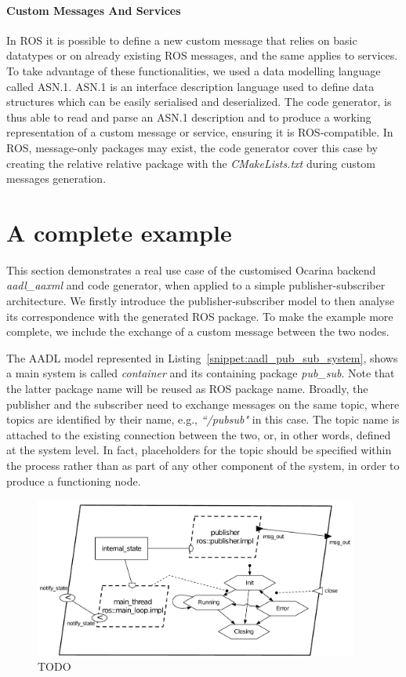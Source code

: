 \paragraph{Custom Messages And Services} In ROS it is possible to define a new custom message that relies on basic datatypes or on already existing ROS messages, and the same applies to services. To take advantage of these functionalities, we used a data modelling language called ASN.1. ASN.1 is an interface description language used to define data structures which can be easily serialised and deserialized. The code generator, is thus able to read and parse an ASN.1 description and to produce a working representation of a custom message or service, ensuring it is ROS-compatible. In ROS, message-only packages may exist, the code generator cover this case by creating the relative relative package with the \textit{CMakeLists.txt} during custom messages generation.

\section{A complete example} \label{sec:pub-sub}

This section demonstrates a real use case of the customised Ocarina backend \textit{aadl\_aaxml} and code generator, when applied to a simple publisher-subscriber architecture. We firstly introduce the publisher-subscriber model to then analyse its correspondence with the generated ROS package. To make the example more complete, we include the exchange of a custom message between the two nodes.

The AADL model represented in Listing~\ref{snippet:aadl_pub_sub_system}, shows a main system is called \textit{container} and its containing package \textit{pub\_sub}. Note that the latter package name will be reused as ROS package name. Broadly, the publisher and the subscriber need to exchange messages on the same topic, where topics are identified by their name, e.g.,  \textit{``/pubsub"} in this case. The topic name is attached to the existing connection between the two, or, in other words, defined at the system level. In fact, placeholders for the topic should be specified within the process rather than as part of any other component of the system, in order to produce a functioning node.

\begin{figure}[t]
\centering
\includegraphics[width=0.95\textwidth]{gfx/usecase-publisher}
\caption{TODO}\label{fig:usecase-publisher}
\end{figure}


